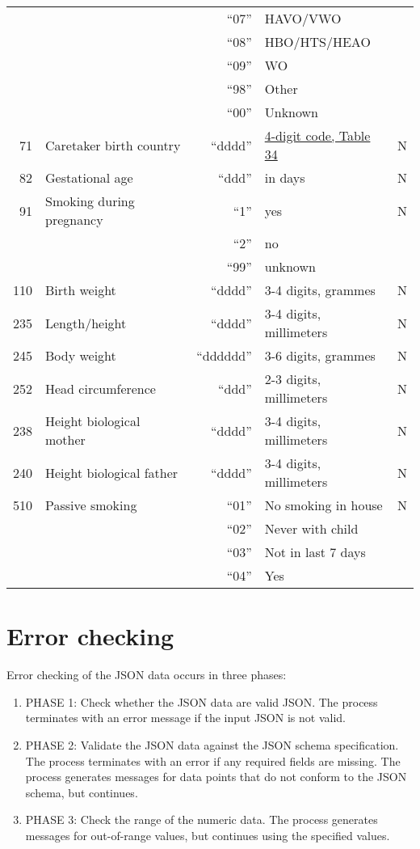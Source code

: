 \documentclass[
]{book}
\begin{document}
\begin{longtable}[]{@{}rlrll@{}}
& & ``07'' & HAVO/VWO & \\
& & ``08'' & HBO/HTS/HEAO & \\
& & ``09'' & WO & \\
& & ``98'' & Other & \\
& & ``00'' & Unknown & \\
71 & Caretaker birth country & ``dddd'' & \href{https://publicaties.rvig.nl/Landelijke_tabellen/Landelijke_tabellen_32_t_m_60_excl_tabel_35/Landelijke_Tabellen_32_t_m_60_in_csv_formaat}{4-digit code, Table 34} & N \\
82 & Gestational age & ``ddd'' & in days & N \\
91 & Smoking during pregnancy & ``1'' & yes & N \\
& & ``2'' & no & \\
& & ``99'' & unknown & \\
110 & Birth weight & ``dddd'' & 3-4 digits, grammes & N \\
235 & Length/height & ``dddd'' & 3-4 digits, millimeters & N \\
245 & Body weight & ``dddddd'' & 3-6 digits, grammes & N \\
252 & Head circumference & ``ddd'' & 2-3 digits, millimeters & N \\
238 & Height biological mother & ``dddd'' & 3-4 digits, millimeters & N \\
240 & Height biological father & ``dddd'' & 3-4 digits, millimeters & N \\
510 & Passive smoking & ``01'' & No smoking in house & N \\
& & ``02'' & Never with child & \\
& & ``03'' & Not in last 7 days & \\
& & ``04'' & Yes & \\
\bottomrule
\end{longtable}

\hypertarget{error-checking}{%
\section{Error checking}\label{error-checking}}

Error checking of the JSON data occurs in three phases:

\begin{enumerate}
\def\labelenumi{\arabic{enumi}.}
\item
  PHASE 1: Check whether the JSON data are valid JSON. The process terminates
  with an error message if the input JSON is not valid.
\item
  PHASE 2: Validate the JSON data against the JSON schema specification. The process terminates
  with an error if any required fields are missing. The process generates messages for data points
  that do not conform to the JSON schema, but continues.
\item
  PHASE 3: Check the range of the numeric data. The process generates messages for out-of-range
  values, but continues using the specified values.
\end{enumerate}
\end{document}
